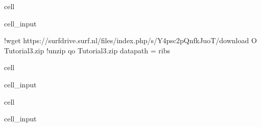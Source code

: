 \documentclass[letterpaper,10pt,english]{jupyterBook}
\begin{document}
\begin{sphinxuseclass}{cell}\begin{sphinxVerbatimInput}

\begin{sphinxuseclass}{cell_input}
\begin{sphinxVerbatim}[commandchars=\\\{\}]
!wget https://surfdrive.surf.nl/files/index.php/s/Y4psc2pQnfkJuoT/download \PYGZhy{}O Tutorial\PYGZus{}3.zip
!unzip \PYGZhy{}qo Tutorial\PYGZus{}3.zip
data\PYGZus{}path = \PYGZdq{}ribs\PYGZdq{}
\end{sphinxVerbatim}

\end{sphinxuseclass}\end{sphinxVerbatimInput}

\end{sphinxuseclass}
\begin{sphinxuseclass}{cell}\begin{sphinxVerbatimInput}

\begin{sphinxuseclass}{cell_input}
\begin{sphinxVerbatim}[commandchars=\\\{\}]
  
\end{sphinxVerbatim}

\end{sphinxuseclass}\end{sphinxVerbatimInput}

\end{sphinxuseclass}
\begin{sphinxuseclass}{cell}\begin{sphinxVerbatimInput}

\begin{sphinxuseclass}{cell_input}
\begin{sphinxVerbatim}[commandchars=\\\{\}]
   

  
\end{sphinxVerbatim}

\end{sphinxuseclass}\end{sphinxVerbatimInput}

\end{sphinxuseclass}
\end{document}
